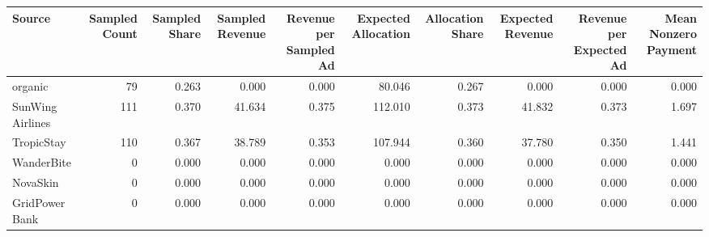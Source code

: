 \begin{tabular}{lrrrrrrrrr}
\hline
Source & Sampled Count & Sampled Share & Sampled Revenue & Revenue per Sampled Ad & Expected Allocation & Allocation Share & Expected Revenue & Revenue per Expected Ad & Mean Nonzero Payment \\
\hline
organic & 79 & 0.263 & 0.000 & 0.000 & 80.046 & 0.267 & 0.000 & 0.000 & 0.000 \\
SunWing Airlines & 111 & 0.370 & 41.634 & 0.375 & 112.010 & 0.373 & 41.832 & 0.373 & 1.697 \\
TropicStay & 110 & 0.367 & 38.789 & 0.353 & 107.944 & 0.360 & 37.780 & 0.350 & 1.441 \\
WanderBite & 0 & 0.000 & 0.000 & 0.000 & 0.000 & 0.000 & 0.000 & 0.000 & 0.000 \\
NovaSkin & 0 & 0.000 & 0.000 & 0.000 & 0.000 & 0.000 & 0.000 & 0.000 & 0.000 \\
GridPower Bank & 0 & 0.000 & 0.000 & 0.000 & 0.000 & 0.000 & 0.000 & 0.000 & 0.000 \\
\hline
\end{tabular}
